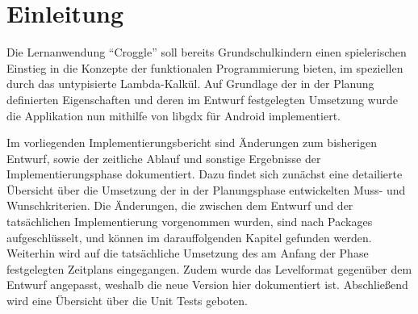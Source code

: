 \chapter{Einleitung}
Die Lernanwendung "`Croggle"' soll bereits Grundschulkindern einen spielerischen Einstieg in die Konzepte der funktionalen Programmierung bieten, im speziellen durch das untypisierte Lambda-Kalkül.
Auf Grundlage der in der Planung definierten Eigenschaften und deren im Entwurf festgelegten Umsetzung wurde die Applikation nun mithilfe von libgdx für Android implementiert.

Im vorliegenden Implementierungsbericht sind Änderungen zum bisherigen Entwurf, sowie der zeitliche Ablauf und sonstige Ergebnisse der Implementierungsphase dokumentiert.
Dazu findet sich zunächst eine detailierte Übersicht über die Umsetzung der in der Planungsphase entwickelten Muss- und Wunschkriterien.
Die Änderungen, die zwischen dem Entwurf und der tatsächlichen Implementierung vorgenommen wurden, sind nach Packages aufgeschlüsselt, und können im darauffolgenden Kapitel gefunden werden.
Weiterhin wird auf die tatsächliche Umsetzung des am Anfang der Phase festgelegten Zeitplans eingegangen.
Zudem wurde das Levelformat gegenüber dem Entwurf angepasst, weshalb die neue Version hier dokumentiert ist.
Abschließend wird eine Übersicht über die Unit Tests geboten.
